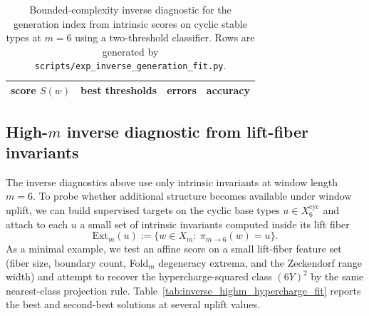 \begin{table}[H]
\centering
\small
\setlength{\tabcolsep}{6pt}
\renewcommand{\arraystretch}{1.15}
\begin{tabular}{l l r r}
\toprule
score $S(w)$ & best thresholds & errors & accuracy \\
\midrule
%
\end{tabular}
\caption{Bounded-complexity inverse diagnostic for the generation index from intrinsic scores on cyclic stable types at $m=6$ using a two-threshold classifier. Rows are generated by \texttt{scripts/exp\_inverse\_generation\_fit.py}.}
\label{tab:inverse_generation_fit}
\end{table}

\subsection{High-\texorpdfstring{$m$}{m} inverse diagnostic from lift-fiber invariants}

The inverse diagnostics above use only intrinsic invariants at window length $m=6$.
To probe whether additional structure becomes available under window uplift, we can build supervised targets on the cyclic base types $u\in X_6^{\mathrm{cyc}}$ and attach to each $u$ a small set of intrinsic invariants computed inside its lift fiber
\[
\mathrm{Ext}_m(u):=\{w\in X_m:\ \pi_{m\to 6}(w)=u\}.
\]
As a minimal example, we test an affine score on a small lift-fiber feature set (fiber size, boundary count, Fold$_m$ degeneracy extrema, and the Zeckendorf range width) and attempt to recover the hypercharge-squared class $(6Y)^2$ by the same nearest-class projection rule.
Table~\ref{tab:inverse_highm_hypercharge_fit} reports the best and second-best solutions at several uplift values.

\begin{table}[H]
\centering
\scriptsize
\setlength{\tabcolsep}{6pt}
\renewcommand{\arraystretch}{1.15}
%
\caption{High-$m$ inverse diagnostic for the hypercharge-squared class $(6Y)^2$ from lift-fiber invariants inside $\mathrm{Ext}_m(u)$ for cyclic base types $u\in X_6^{\mathrm{cyc}}$. Rows are generated by \texttt{scripts/exp\_inverse\_highm\_hypercharge\_fit.py}.}
\label{tab:inverse_highm_hypercharge_fit}
\end{table}

